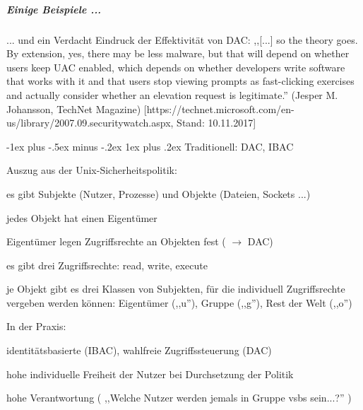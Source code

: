 \documentclass[a4paper]{article}
\makeatletter
\renewcommand{\subsubsection}{\@startsection{subsubsection}{3}{0mm}%
 {-1ex plus -.5ex minus -.2ex}%
 {1ex plus .2ex}%
 {\normalfont\small\bfseries}}
\makeatother
\begin{document}
\begin{multicols}{3}
    \subparagraph{Einige Beispiele ...}


    ... und ein Verdacht Eindruck der Effektivität von DAC: ,,{[}...{]} so
    the theory goes. By extension, yes, there may be less malware, but that
    will depend on whether users keep UAC enabled, which depends on whether
    developers write software that works with it and that users stop viewing
    prompts as fast-clicking exercises and actually consider whether an
    elevation request is legitimate.'' (Jesper M. Johansson, TechNet
    Magazine)
    {[}https://technet.microsoft.com/en-us/library/2007.09.securitywatch.aspx,
    Stand: 10.11.2017{]}


    \subsubsection{Traditionell: DAC, IBAC}

    Auszug aus der Unix-Sicherheitspolitik:

    \begin{itemize*}
        \item
        es gibt Subjekte (Nutzer, Prozesse) und Objekte (Dateien, Sockets ...)
        \item
        jedes Objekt hat einen Eigentümer
        \item
        Eigentümer legen Zugriffsrechte an Objekten fest
        ( $\rightarrow$ DAC)
        \item
        es gibt drei Zugriffsrechte: read, write, execute
        \item
        je Objekt gibt es drei Klassen von Subjekten, für die individuell
        Zugriffsrechte vergeben werden können: Eigentümer (,,u''), Gruppe
        (,,g''), Rest der Welt (,,o'')
    \end{itemize*}

    In der Praxis:

    \begin{itemize*}
        \item
        identitätsbasierte (IBAC), wahlfreie Zugriffssteuerung (DAC)
        \item
        hohe individuelle Freiheit der Nutzer bei Durchsetzung der Politik
        \item
        hohe Verantwortung ( ,,Welche Nutzer werden jemals in Gruppe vsbs
        sein...?'' )
    \end{itemize*}


\end{multicols}
\end{document}
